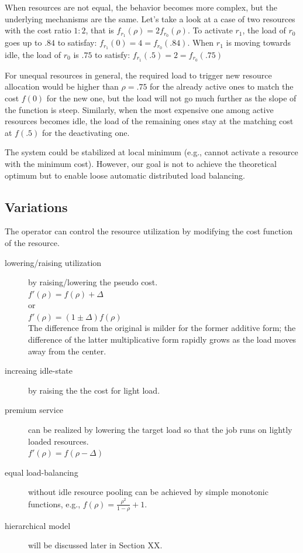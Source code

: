 When resources are not equal, the behavior becomes more complex, but
the underlying mechanisms are the same.
Let's take a look at a case of two resources with the cost ratio $1:2$,
that is $f_{r_1{}}(\rho) = 2 f_{r_{0}}(\rho)$.
To activate $r_{1}$, the load of $r_{0}$ goes up to $.84$ to satisfay:
$f_{r_{1}}(0) = 4 = f_{r_{0}}(.84)$.
When $r_{1}$ is moving towards idle, the load of $r_{0}$ is $.75$ to
satisfy: $f_{r_{1}}(.5) = 2 = f_{r_{0}}(.75)$

For unequal resources in general, the required load to trigger new
resource allocation would be higher than $\rho = .75$ for the already
active ones to match the cost $f(0)$ for the new one, but the load
will not go much further as the slope of the function is steep.
Similarly, when the most expensive one among active resources becomes
idle, the load of the remaining ones stay at the matching cost at
$f(.5)$ for the deactivating one. 

The system could be stabilized at local minimum (e.g., cannot activate
a resource with the minimum cost).
However, our goal is not to achieve the theoretical optimum but to
enable loose automatic distributed load balancing.

\subsection{Variations}

The operator can control the resource utilization by modifying the cost
function of the resource.

\begin{description}
\item[lowering/raising utilization] by raising/lowering the pseudo cost. \\
  $f'(\rho) = f(\rho) + \Delta$ \\
or \\
  $f'(\rho) = (1 \pm \Delta)f(\rho)$ \\
The difference from the original is milder for the former additive
form; the difference of the latter multiplicative form rapidly grows
as the load moves away from the center.

\item[increaing idle-state] by raising the the cost for light load.
\item[premium service] can be realized by lowering the target load so
  that the job runs on lightly loaded resources. \\
  $f'(\rho) = f(\rho - \Delta)$
\item[equal load-balancing] without idle resource pooling can be
  achieved by simple monotonic functions, e.g.,
  $f(\rho) = \frac{\rho^{2}}{1 - \rho} + 1$.
\item[hierarchical model] will be discussed later in Section XX.
\end{description}

